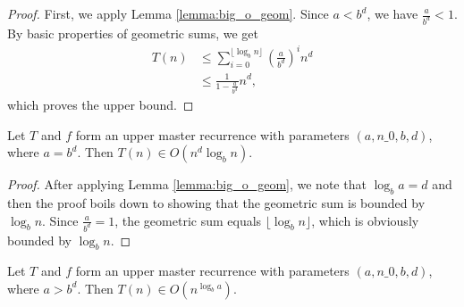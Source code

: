 \begin{proof}
    \leanok
    First, we apply Lemma \ref{lemma:big_o_geom}. Since $a < b^d$, we have 
    $\frac{a}{b^d} < 1$. By basic properties of geometric sums, we get
    \begin{align*}
        T(n) &\leq \sum_{i=0}^{\lfloor \log_b{n} \rfloor} 
                        (\frac{a}{b^d})^i n^d \\
             &\leq \frac{1}{1 - \frac{a}{b^d}} n^d,
    \end{align*}
    which proves the upper bound.
\end{proof}

\begin{theorem}
    \label{thm:big_o_of_eq}
    \leanok
    Let $T$ and $f$ form an upper master recurrence with parameters
    $(a, n\_0, b, d)$, where $a = b^d$. Then $T(n) \in O(n^d \log_b{n})$.
\end{theorem}

\begin{proof}
    \leanok
    After applying Lemma \ref{lemma:big_o_geom}, we note that $\log_b{a} = d$
    and then the proof boils down to showing that the geometric sum is bounded 
    by $\log_b{n}$. Since $\frac{a}{b^d} = 1$, the geometric sum equals
    $\lfloor \log_b{n} \rfloor$, which is obviously bounded by $\log_b{n}$.
\end{proof}

\begin{theorem}
    \label{thm:big_o_of_gt}
    \leanok
    Let $T$ and $f$ form an upper master recurrence with parameters
    $(a, n\_0, b, d)$, where $a > b^d$. Then $T(n) \in O(n^{\log_b{a}})$.
\end{theorem}

